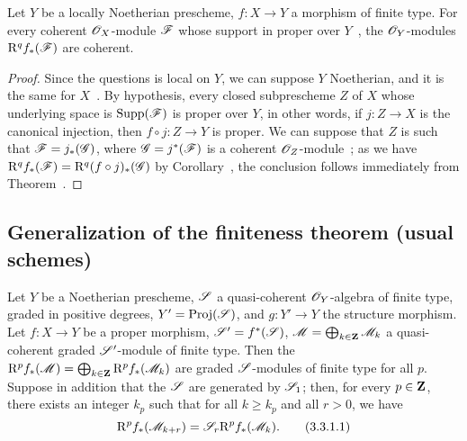 \begin{corollary}[3.2.4]
\label{III.3.2.4}
Let $Y$ be a locally Noetherian prescheme, $f:X\to Y$ a morphism of finite type.
For every coherent $\mathscr{O}_X$-module $\mathscr{F}$ whose support in proper over $Y$~, the $\mathscr{O}_Y$-modules $\mathrm{R}^q f_*(\mathscr{F})$ are coherent.
\end{corollary}

\begin{proof}
Since the questions is local on $Y$, we can suppose $Y$ Noetherian, and it is the same for $X$~.
By hypothesis, every closed subprescheme $Z$ of $X$ whose underlying space is $\operatorname{Supp}(\mathscr{F})$ is proper over $Y$, in other words, if $j:Z\to X$ is the canonical injection, then $f\circ j:Z\to Y$ is proper.
We can suppose that $Z$ is such that $\mathscr{F}=j_*(\mathscr{G})$, where $\mathscr{G}=j^*(\mathscr{F})$ is a coherent $\mathscr{O}_Z$-module~; as we have $\mathrm{R}^q f_*(\mathscr{F})=\mathrm{R}^q(f\circ j)_*(\mathscr{G})$ by Corollary~, the conclusion follows immediately from Theorem~.
\end{proof}

\subsection{Generalization of the finiteness theorem (usual schemes)}
\label{subsection:III.3.3}

\begin{proposition}[3.3.1]
\label{III.3.3.1}
Let $Y$ be a Noetherian prescheme, $\mathscr{S}$ a quasi-coherent $\mathscr{O}_Y$-algebra of finite type, graded in positive degrees, $Y'=\operatorname{Proj}(\mathscr{S})$, and $g:Y'\to Y$ the structure morphism.
Let $f:X\to Y$ be a proper morphism, $\mathscr{S}'=f^*(\mathscr{S})$, $\mathscr{M}=\bigoplus_{k\in\mathbf{Z}}\mathscr{M}_k$ a quasi-coherent graded $\mathscr{S}'$-module of finite type.
Then the $\mathrm{R}^p f_*(\mathscr{M})=\bigoplus_{k\in\mathbf{Z}}\mathrm{R}^p f_*(\mathscr{M}_k)$ are graded $\mathscr{S}$-modules of finite type for all $p$.
Suppose in addition that the $\mathscr{S}$ are generated by $\mathscr{S}_1$; then, for every $p\in\mathbf{Z}$, there exists an integer $k_p$ such that for all $k\geq k_p$ and all $r>0$, we have
\[
\label{III.3.3.1.1}
  \mathrm{R}^p f_*(\mathscr{M}_{k+r})=\mathscr{S}_r\mathrm{R}^p f_*(\mathscr{M}_k).
  \tag{3.3.1.1}
\] 
\end{proposition}

